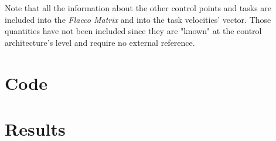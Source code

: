 \documentclass[11pt,a4paper, twocolumn, twoside]{article}
\begin{document}
Note that all the information about the other control points and tasks are included into the \emph{Flacco Matrix} and into the task velocities' vector.
Those quantities have not been included since they are "known" at the control architecture's level and require no external reference.
\section{Code}

\section{Results}



\tableofcontents
\end{document}
